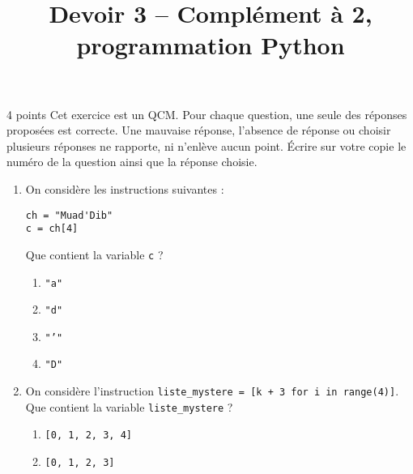 \documentclass[a4paper,dvipsnames]{article}
\title{Devoir 3 -- Complément à 2, programmation Python}
\author{}
\date{}
\begin{document}
\renewcommand{\contentsname}{}

\pagestyle{fancy}

\begin{tcolorbox}[colframe=blue!75, colback=blue!45, valign=center, height=1.5cm, top=5mm]
  \maketitle
\end{tcolorbox}


\vspace{1cm}

\thispagestyle{fancy}

\begin{exercice}{4 points}{}
  Cet exercice est un QCM. Pour chaque question, une seule des réponses proposées est correcte. Une mauvaise réponse, l'absence de réponse ou choisir plusieurs réponses ne rapporte, ni n'enlève aucun point.
  Écrire sur votre copie le numéro de la question ainsi que la réponse choisie.
  \begin{enumerate}
    \item On considère les instructions suivantes :
      \begin{verbatim}
ch = "Muad'Dib"
c = ch[4]
      \end{verbatim}
      Que contient la variable \texttt{c} ?
      \vspace*{-2mm}
      \begin{multicols}{4}
        \begin{enumerate}
	  \item \texttt{"a"}
	  \item \texttt{"d"}
	  \item \texttt{"'"}
	  \item \texttt{"D"}
        \end{enumerate}
      \end{multicols}
    \item On considère l'instruction \texttt{liste_mystere = [k + 3 for i in range(4)]}. Que contient la variable \texttt{liste_mystere} ?
      \vspace*{-2mm}
      \begin{multicols}{2}
        \begin{enumerate}
	  \item \texttt{[0, 1, 2, 3, 4]}
	  \item \texttt{[0, 1, 2, 3]}

\end{enumerate}
\end{multicols}
\end{enumerate}
\end{exercice}
\end{document}
